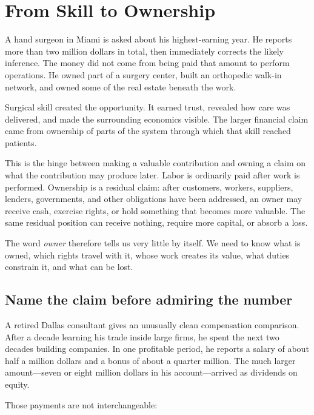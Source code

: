 \chapter{From Skill to Ownership}

A hand surgeon in Miami is asked about his highest-earning year. He reports
more than two million dollars in total, then immediately corrects the likely
inference. The money did not come from being paid that amount to perform
operations. He owned part of a surgery center, built an orthopedic walk-in
network, and owned some of the real estate beneath the work.

Surgical skill created the opportunity. It earned trust, revealed how care was
delivered, and made the surrounding economics visible. The larger financial
claim came from ownership of parts of the system through which that skill
reached patients.

This is the hinge between making a valuable contribution and owning a claim on
what the contribution may produce later. Labor is ordinarily paid after work
is performed. Ownership is a residual claim: after customers, workers,
suppliers, lenders, governments, and other obligations have been addressed, an
owner may receive cash, exercise rights, or hold something that becomes more
valuable. The same residual position can receive nothing, require more capital,
or absorb a loss.

The word \emph{owner} therefore tells us very little by itself. We need to know
what is owned, which rights travel with it, whose work creates its value, what
duties constrain it, and what can be lost.

\section{Name the claim before admiring the number}

A retired Dallas consultant gives an unusually clean compensation comparison.
After a decade learning his trade inside large firms, he spent the next two
decades building companies. In one profitable period, he reports a salary of
about half a million dollars and a bonus of about a quarter million. The much
larger amount---seven or eight million dollars in his account---arrived as
dividends on equity.

Those payments are not interchangeable:

